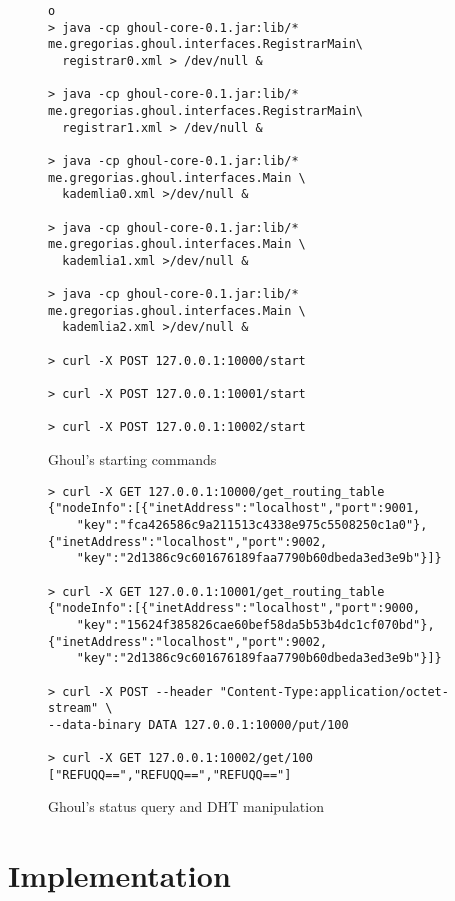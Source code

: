 \begin{figure}[tb]
\begin{verbatim}o
> java -cp ghoul-core-0.1.jar:lib/* me.gregorias.ghoul.interfaces.RegistrarMain\
  registrar0.xml > /dev/null &

> java -cp ghoul-core-0.1.jar:lib/* me.gregorias.ghoul.interfaces.RegistrarMain\
  registrar1.xml > /dev/null &

> java -cp ghoul-core-0.1.jar:lib/* me.gregorias.ghoul.interfaces.Main \ 
  kademlia0.xml >/dev/null &

> java -cp ghoul-core-0.1.jar:lib/* me.gregorias.ghoul.interfaces.Main \ 
  kademlia1.xml >/dev/null &

> java -cp ghoul-core-0.1.jar:lib/* me.gregorias.ghoul.interfaces.Main \ 
  kademlia2.xml >/dev/null &

> curl -X POST 127.0.0.1:10000/start

> curl -X POST 127.0.0.1:10001/start

> curl -X POST 127.0.0.1:10002/start
\end{verbatim}
\caption{Ghoul's starting commands}
\label{fig:ghoul_manual_run}
\end{figure}

\begin{figure}[tb]
\begin{verbatim}
> curl -X GET 127.0.0.1:10000/get_routing_table
{"nodeInfo":[{"inetAddress":"localhost","port":9001,
    "key":"fca426586c9a211513c4338e975c5508250c1a0"},
{"inetAddress":"localhost","port":9002,
    "key":"2d1386c9c601676189faa7790b60dbeda3ed3e9b"}]}

> curl -X GET 127.0.0.1:10001/get_routing_table
{"nodeInfo":[{"inetAddress":"localhost","port":9000,
    "key":"15624f385826cae60bef58da5b53b4dc1cf070bd"},
{"inetAddress":"localhost","port":9002,
    "key":"2d1386c9c601676189faa7790b60dbeda3ed3e9b"}]}

> curl -X POST --header "Content-Type:application/octet-stream" \ 
--data-binary DATA 127.0.0.1:10000/put/100

> curl -X GET 127.0.0.1:10002/get/100
["REFUQQ==","REFUQQ==","REFUQQ=="]
\end{verbatim}
\caption{Ghoul's status query and DHT manipulation}
\label{fig:ghoul_manipulation}
\end{figure}

\section{Implementation}

